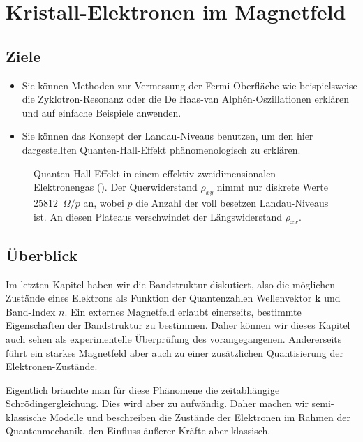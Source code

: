 \renewcommand{\chapterauthors}{Markus Lippitz}
\renewcommand{\lastmod}{12. Mai 2023} 

\chapter{Kristall-Elektronen im Magnetfeld}




\section{Ziele}
 
\begin{itemize}
\item Sie können  Methoden zur Vermessung der Fermi-Oberfläche wie beispielsweise die Zyklotron-Resonanz oder die De Haas-van Alphén-Oszillationen erklären und auf einfache Beispiele anwenden.
\item Sie können das Konzept der Landau-Niveaus benutzen, um den hier dargestellten Quanten-Hall-Effekt phänomenologisch zu erklären.
\end{itemize}


\begin{figure}
    \caption{Quanten-Hall-Effekt in einem effektiv zweidimensionalen Elektronengas (\cite{Klitzing1984}). Der Querwiderstand $\rho_{xy}$ nimmt nur diskrete Werte 25812~$\Omega / p$ an, wobei $p$ die Anzahl der voll besetzen Landau-Niveaus ist. An diesen Plateaus verschwindet der Längswiderstand $\rho_{xx}$.}
    \label{fig:4_qhe_gaas}
\end{figure}
 

\section{Überblick}

Im letzten Kapitel haben wir die Bandstruktur diskutiert, also die möglichen Zustände eines Elektrons als Funktion der Quantenzahlen Wellenvektor $\mathbf{k}$ und Band-Index $n$. Ein externes Magnetfeld erlaubt einerseits, bestimmte  Eigenschaften der Bandstruktur zu bestimmen. Daher können wir dieses Kapitel auch sehen als experimentelle Überprüfung des vorangegangenen. Andererseits führt ein starkes Magnetfeld aber auch zu einer zusätzlichen Quantisierung der Elektronen-Zustände.

Eigentlich bräuchte man für diese Phänomene die zeitabhängige Schrödingergleichung. Dies wird aber zu aufwändig. Daher machen wir semi-klassische Modelle und beschreiben die Zustände der Elektronen im Rahmen der Quantenmechanik, den Einfluss äußerer Kräfte aber klassisch.

